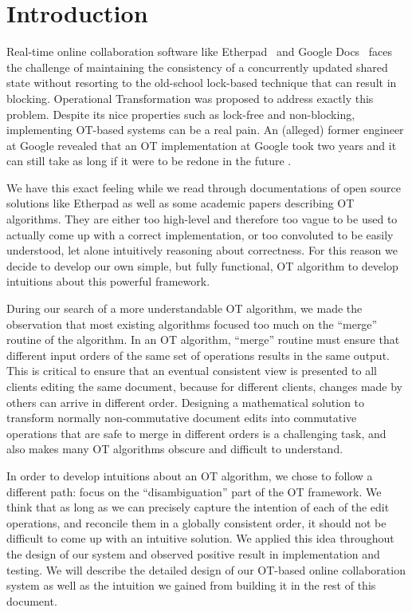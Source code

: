 \section{Introduction}

Real-time online collaboration software like Etherpad~\cite{etherpad} and Google Docs~\cite{gdocs}
faces the challenge of maintaining the consistency of a concurrently updated shared state without
resorting to the old-school lock-based technique that can result in blocking. Operational
Transformation \cite{sun1998operational} was proposed to address exactly this problem. Despite its
nice properties such as lock-free and non-blocking, implementing OT-based systems can be a real
pain. An (alleged) former engineer at Google revealed that an OT implementation at Google took two
years and it can still take as long if it were to be redone in the future \cite{sharejs}.

We have this exact feeling while we read through documentations of open source solutions like
Etherpad as well as some academic papers describing OT algorithms. They are either too high-level
and therefore too vague to be used to actually come up with a correct implementation, or too
convoluted to be easily understood, let alone intuitively reasoning about correctness. For this
reason we decide to develop our own simple, but fully functional, OT algorithm to develop intuitions
about this powerful framework.

During our search of a more understandable OT algorithm, we made the observation that most existing
algorithms focused too much on the ``merge'' routine of the algorithm. In an OT algorithm, ``merge''
routine must ensure that different input orders of the same set of operations results in the same
output. This is critical to ensure that an eventual consistent view is presented to all clients
editing the same document, because for different clients, changes made by others can arrive in
different order. Designing a mathematical solution to transform normally non-commutative document
edits into commutative operations that are safe to merge in different orders is a challenging task,
and also makes many OT algorithms obscure and difficult to understand.

In order to develop intuitions about an OT algorithm, we chose to follow a different path: focus on
the ``disambiguation'' part of the OT framework. We think that as long as we can precisely capture
the intention of each of the edit operations, and reconcile them in a globally consistent order, it
should not be difficult to come up with an intuitive solution. We applied this idea throughout the
design of our system and observed positive result in implementation and testing. We will describe
the detailed design of our OT-based online collaboration system as well as the intuition we gained
from building it in the rest of this document.
